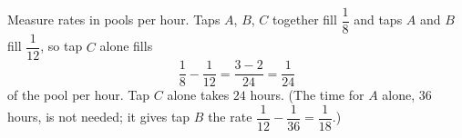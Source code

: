 Measure rates in pools per hour. Taps $A$, $B$, $C$ together fill $\dfrac{1}{8}$ and taps $A$ and $B$ fill $\dfrac{1}{12}$, so tap $C$ alone fills
\[\dfrac{1}{8}-\dfrac{1}{12}=\dfrac{3-2}{24}=\dfrac{1}{24}\]
of the pool per hour. Tap $C$ alone takes $\boxed{24}$ hours. (The time for $A$ alone, $36$ hours, is not needed; it gives tap $B$ the rate $\dfrac{1}{12}-\dfrac{1}{36}=\dfrac{1}{18}$.)
